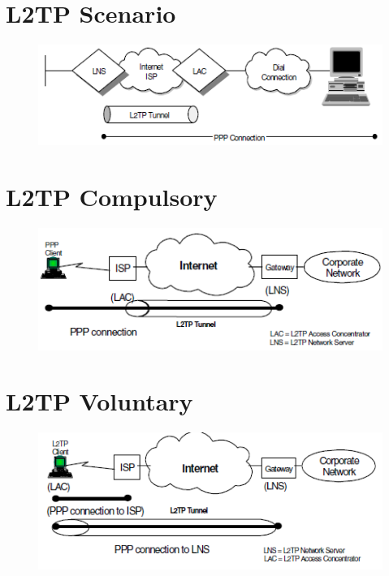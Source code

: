 \documentclass[10pt,a4paper]{article}
\begin{document}
\newpage
\section{L2TP Scenario}

\begin{figure}[hbtp]
\centering
\includegraphics[scale=1]{L2TP_Scenario.png}
\end{figure}

\newpage
\section{L2TP Compulsory}

\begin{figure}[hbtp]
\centering
\includegraphics[scale=1]{L2TPCompulsory.png}
\end{figure}

\newpage
\section{L2TP Voluntary}

\begin{figure}[hbtp]
\centering
\includegraphics[scale=1]{L2TPVoluntary.png}
\end{figure}
\end{document}
